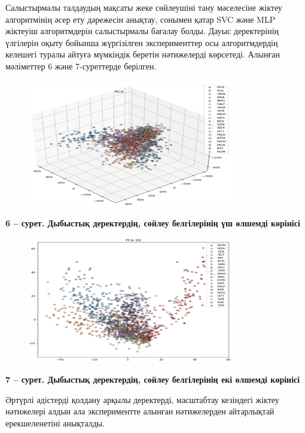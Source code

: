 Салыстырмалы талдаудың мақсаты жеке сөйлеушіні тану мәселесіне жіктеу
алгоритмінің әсер ету дәрежесін анықтау, сонымен қатар SVC және MLP
жіктеуіш алгоритмдерін салыстырмалы бағалау болды. Дауыс деректерінің
үлгілерін оқыту бойынша жүргізілген эксперименттер осы алгоритмдердің
келешегі туралы айтуға мүмкіндік беретін нәтижелерді көрсетеді. Алынған
мәліметтер 6 және 7-суреттерде берілген.

\begin{figure}[H]
	\centering
	\includegraphics[width=0.8\textwidth]{media/ict/image11}
	\caption*{}
\end{figure}


{\bfseries 6 -- сурет. Дыбыстық деректердің, сөйлеу белгілерінің үш өлшемді
көрінісі}

\begin{figure}[H]
	\centering
	\includegraphics[width=0.8\textwidth]{media/ict/image12}
	\caption*{}
\end{figure}


{\bfseries 7 -- сурет. Дыбыстық деректердің, сөйлеу белгілерінің екі
өлшемді көрінісі}

Әртүрлі әдістерді қолдану арқылы деректерді, масштабтау кезіндегі жіктеу
нәтижелері алдын ала экспериментте алынған нәтижелерден айтарлықтай
ерекшеленетіні анықталды.

